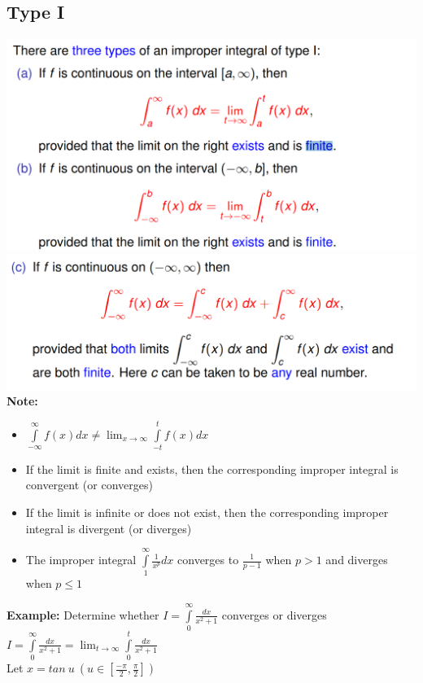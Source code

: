 \documentclass{article}
\begin{document}
\subsection{Type I}
\includegraphics[width=1\linewidth]{tyoe1.png}
\includegraphics[width=1\linewidth]{type1-2.png}
\textbf{Note: }
\begin{itemize}
    \item $\displaystyle\int\limits_{-\infty}^{\infty}f(x)dx\ne \lim_{x\rightarrow\infty}\int\limits_{-t}^{t}f(x)dx$ 
    \item If the limit is finite and exists, then the corresponding improper integral is convergent (or converges)
    \item If the limit is infinite or does not exist, then the corresponding improper integral is divergent (or diverges)
    \item The improper integral $\displaystyle\int\limits_{1}^{\infty}\frac{1}{x^p}dx$ converges to $\displaystyle\frac{1}{p-1}$ when $p>1$ and diverges when $p\le1$\\
\end{itemize}
\textbf{Example: } Determine whether $I=\displaystyle\int\limits_{0}^{\infty}\frac{dx}{x^2+1}$ converges or diverges\\
$I=\displaystyle\int\limits_{0}^{\infty}\frac{dx}{x^2+1}=\lim_{t\rightarrow \infty}\displaystyle\int\limits_{0}^{t}\frac{dx}{x^2+1}$\\
Let $x=tan\ u\ \left(u\in \left[\displaystyle\frac{-\pi}{2},\frac{\pi}{2}\right]\right)$\\
\end{document}
